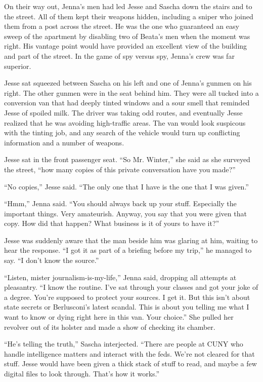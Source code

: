 \documentclass[12pt]{book}
\begin{document}
On their way out, Jenna's men had led Jesse and Sascha down the stairs and to the street.  All of them kept their weapons hidden, including a sniper who joined them from a post across the street.  He was the one who guaranteed an easy sweep of the apartment by disabling two of Beata's men when the moment was right.  His vantage point would have provided an excellent view of the building and part of the street.  In the game of spy versus spy, Jenna's crew was far superior.

Jesse sat squeezed between Sascha on his left and one of Jenna's gunmen on his right.  The other gunmen were in the seat behind him.  They were all tucked into a conversion van that had deeply tinted windows and a sour smell that reminded Jesse of spoiled milk.  The driver was taking odd routes, and eventually Jesse realized that he was avoiding high-traffic areas.  The van would look suspicous with the tinting job, and any search of the vehicle would turn up conflicting information and a number of weapons.

Jesse sat in the front passenger seat.  ``So Mr. Winter,'' she said as she surveyed the street, ``how many copies of this private conversation have you made?''

``No copies,'' Jesse said.  ``The only one that I have is the one that I was given.''

``Hmm,'' Jenna said.  ``You should always back up your stuff.  Especially the important things.  Very amateurish.  Anyway, you say that you were given that copy.  How did that happen?  What business is it of yours to have it?''

Jesse was suddenly aware that the man beside him was glaring at him, waiting to hear the response.  ``I got it as part of a briefing before my trip,'' he managed to say.  ``I don't know the source.''

``Listen, mister journalism-is-my-life,'' Jenna said, dropping all attempts at pleasantry.  ``I know the routine.  I've sat through your classes and got your joke of a degree.  You're supposed to protect your sources.  I get it.  But this isn't about state secrets or Berlusconi's latest scandal.  This is about you telling me what I want to know or dying right here in this van.  Your choice.''  She pulled her revolver out of its holster and made a show of checking its chamber.

``He's telling the truth,'' Sascha interjected.  ``There are people at CUNY who handle intelligence matters and interact with the feds.  We're not cleared for that stuff.  Jesse would have been given a thick stack of stuff to read, and maybe a few digital files to look through.  That's how it works.''
\end{document}
